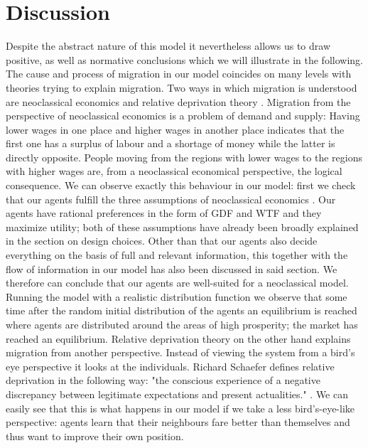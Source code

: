 \documentclass{JASSS}
\begin{document}
\section{Discussion}
Despite the abstract nature of this model it nevertheless allows us to draw positive, as well as normative conclusions which we will illustrate in the following.
The cause and process of migration in our model coincides on many levels with theories trying to explain migration. Two ways in which migration is understood are neoclassical economics and relative deprivation theory \citep{jennissen}. Migration from the perspective of neoclassical economics is a problem of demand and supply: Having lower wages in one place and higher wages in another place indicates that the first one has a surplus of labour and a shortage of money while the latter is directly opposite. People moving from the regions with lower wages to the regions with higher wages are, from a neoclassical economical perspective, the logical consequence. We can observe exactly this behaviour in our model: first we check that our agents fulfill the three assumptions of neoclassical economics \citep{weintraub}. Our agents have rational preferences in the form of GDF and WTF and they maximize utility; both of these assumptions have already been broadly explained in the section on design choices. Other than that our agents also decide everything on the basis of full and relevant information, this together with the flow of information in our model has also been discussed in said section. We therefore can conclude that our agents are well-suited for a neoclassical model. Running the model with a realistic distribution function we observe that some time after the random initial distribution of the agents an equilibrium is reached where agents are distributed around the areas of high prosperity; the market has reached an equilibrium.
Relative deprivation theory on the other hand explains migration from another perspective. Instead of viewing the system from a bird's eye perspective it looks at the individuals. Richard Schaefer defines relative deprivation in the following way: "the conscious experience of a negative discrepancy between legitimate expectations and present actualities." \citep{schaefer}. We can easily see that this is what happens in our model if we take a less bird's-eye-like perspective: agents learn that their neighbours fare better than themselves and thus want to improve their own position.
\end{document}
